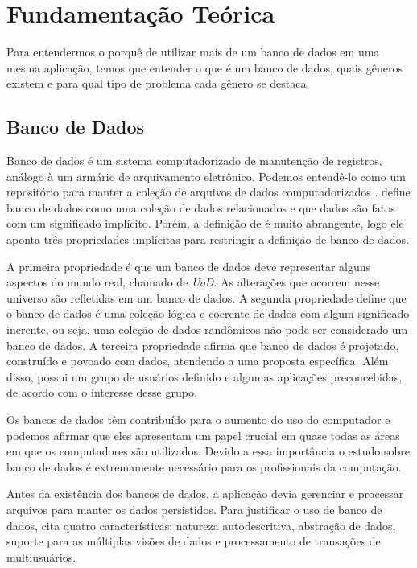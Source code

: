 \chapter{Fundamentação Teórica}
\label{chap:fundamentacaoTeorica}


Para entendermos o porquê de utilizar mais de um banco de dados em uma mesma aplicação, temos que entender o que é um banco de dados, quais gêneros existem e para qual tipo de problema cada gênero se destaca.

\section{Banco de Dados}
\label{sec:database}

Banco de dados é um sistema computadorizado de manutenção de registros, análogo à um armário de arquivamento eletrônico. Podemos entendê-lo como um repositório para manter a coleção de arquivos de dados computadorizados \cite{CJDate}.  define banco de dados como uma coleção de dados relacionados e que dados são fatos com um significado implícito. Porém, a definição de  é muito abrangente, logo ele aponta três propriedades implícitas para restringir a definição de banco de dados.

A primeira propriedade é que um banco de dados deve representar alguns aspectos do mundo real, chamado de \textit{\ac{UoD}}. As alterações que ocorrem nesse universo são refletidas em um banco de dados. A segunda propriedade define que o banco de dados é uma coleção lógica e coerente de dados com algum significado inerente, ou seja, uma coleção de dados randômicos não pode ser considerado um banco de dados. A terceira propriedade afirma que banco de dados é projetado, construído e povoado com dados, atendendo a uma proposta específica. Além disso, possui um grupo de usuários definido e algumas aplicações preconcebidas, de acordo com o interesse desse grupo.

Os bancos de dados têm contribuído para o aumento do uso do computador \cite{Elmasri} e podemos afirmar que eles apresentam um papel crucial em quase todas as áreas em que os computadores são utilizados. Devido a essa importância o estudo sobre banco de dados é extremamente necessário para os profissionais da computação.

Antes da existência dos bancos de dados, a aplicação devia gerenciar e processar arquivos para manter os dados persistidos. Para justificar o uso de banco de dados,  cita quatro características: natureza autodescritiva, abstração de dados, suporte para as múltiplas visões de dados e processamento de transações de multiusuários.

